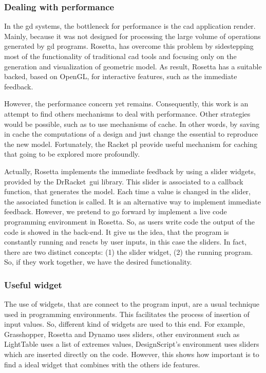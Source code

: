 \subsubsection{Dealing with performance}

In the \ac{gd} systems, the bottleneck for performance is the \ac{cad} application render. Mainly, because it was not designed for processing the large volume of operations generated by \ac{gd} programs. Rosetta, has overcome this problem by sidestepping most of the functionality of traditional \ac{cad} tools and focusing only on the generation and visualization of geometric model. As result, Rosetta has a suitable backed, based on OpenGL, for interactive features, such as the immediate feedback.

However, the performance concern yet remains. Consequently, this work is an attempt to find others mechanisms to deal with performance. Other strategies would be possible, such as to use mechanisms of cache. In other words, by saving in cache the computations of a design and just change the essential to reproduce the new model. Fortunately, the Racket \ac{pl} provide useful mechanism for caching that going to be explored more profoundly.

Actually, Rosetta implements the immediate feedback by using a slider widgets, provided by the DrRacket~\ac{gui} library. This slider is associated to a callback function, that generates the model. Each time a value is changed in the slider, the associated function is called. It is an alternative way to implement immediate feedback. However, we pretend to go forward by implement a live code programming environment in Rosetta. So, as users write code the output of the code is showed in the back-end. It give us the idea, that the program is constantly running and reacts by user inputs, in this case the sliders. In fact, there are two distinct concepts: (1) the slider widget, (2) the running program. So, if they work together, we have the desired functionality.

\subsubsection{Useful widget}

The use of widgets, that are connect to the program input, are a usual technique used in programming environments. This facilitates the process of insertion of input values. So, different kind of widgets are used to this end. For example, Grasshopper, Rosetta and Dynamo uses sliders, other environment such as LightTable uses a list of extremes values, DesignScript's environment uses sliders which are inserted directly on the code. However, this shows how important is to find a ideal widget that combines with the others \ac{ide} features.

